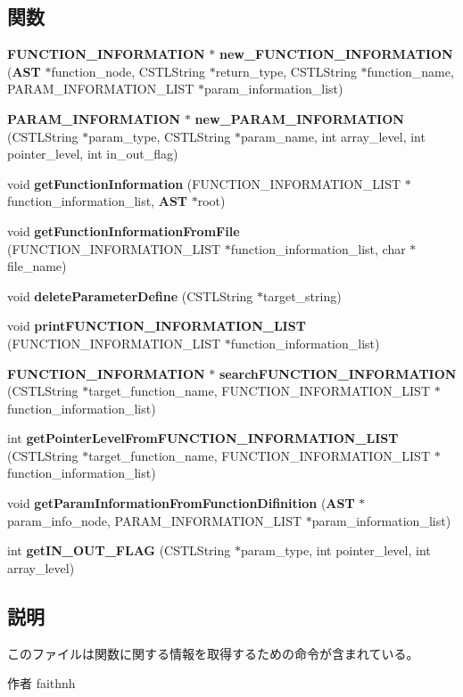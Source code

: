 \subsection*{関数}
\begin{DoxyCompactItemize}
\item 
{\bf FUNCTION\_\-INFORMATION} $\ast$ {\bf new\_\-FUNCTION\_\-INFORMATION} ({\bf AST} $\ast$function\_\-node, CSTLString $\ast$return\_\-type, CSTLString $\ast$function\_\-name, PARAM\_\-INFORMATION\_\-LIST $\ast$param\_\-information\_\-list)
\item 
{\bf PARAM\_\-INFORMATION} $\ast$ {\bf new\_\-PARAM\_\-INFORMATION} (CSTLString $\ast$param\_\-type, CSTLString $\ast$param\_\-name, int array\_\-level, int pointer\_\-level, int in\_\-out\_\-flag)
\item 
void {\bf getFunctionInformation} (FUNCTION\_\-INFORMATION\_\-LIST $\ast$function\_\-information\_\-list, {\bf AST} $\ast$root)
\item 
void {\bf getFunctionInformationFromFile} (FUNCTION\_\-INFORMATION\_\-LIST $\ast$function\_\-information\_\-list, char $\ast$file\_\-name)
\item 
void {\bf deleteParameterDefine} (CSTLString $\ast$target\_\-string)
\item 
void {\bf printFUNCTION\_\-INFORMATION\_\-LIST} (FUNCTION\_\-INFORMATION\_\-LIST $\ast$function\_\-information\_\-list)
\item 
{\bf FUNCTION\_\-INFORMATION} $\ast$ {\bf searchFUNCTION\_\-INFORMATION} (CSTLString $\ast$target\_\-function\_\-name, FUNCTION\_\-INFORMATION\_\-LIST $\ast$function\_\-information\_\-list)
\item 
int {\bf getPointerLevelFromFUNCTION\_\-INFORMATION\_\-LIST} (CSTLString $\ast$target\_\-function\_\-name, FUNCTION\_\-INFORMATION\_\-LIST $\ast$function\_\-information\_\-list)
\item 
void {\bf getParamInformationFromFunctionDifinition} ({\bf AST} $\ast$param\_\-info\_\-node, PARAM\_\-INFORMATION\_\-LIST $\ast$param\_\-information\_\-list)
\item 
int {\bf getIN\_\-OUT\_\-FLAG} (CSTLString $\ast$param\_\-type, int pointer\_\-level, int array\_\-level)
\end{DoxyCompactItemize}


\subsection{説明}
このファイルは関数に関する情報を取得するための命令が含まれている。 \begin{DoxyAuthor}{作者}
faithnh 
\end{DoxyAuthor}


